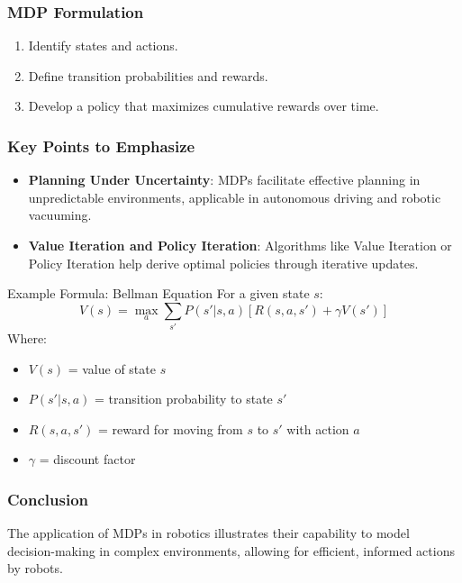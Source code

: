 \documentclass[aspectratio=169]{beamer}
\begin{document}
\begin{frame}[fragile]
    \frametitle{MDP Formulation}
    \begin{enumerate}
        \item Identify states and actions.
        \item Define transition probabilities and rewards.
        \item Develop a policy that maximizes cumulative rewards over time.
    \end{enumerate}
\end{frame}

\begin{frame}[fragile]
    \frametitle{Key Points to Emphasize}
    \begin{itemize}
        \item \textbf{Planning Under Uncertainty}: MDPs facilitate effective planning in unpredictable environments, applicable in autonomous driving and robotic vacuuming.
        \item \textbf{Value Iteration and Policy Iteration}: Algorithms like Value Iteration or Policy Iteration help derive optimal policies through iterative updates.
    \end{itemize}
    \begin{block}{Example Formula: Bellman Equation}
        For a given state \(s\):
        \begin{equation}
            V(s) = \max_{a} \sum_{s'} P(s'|s,a)[R(s, a, s') + \gamma V(s')]
        \end{equation}
        Where:
        \begin{itemize}
            \item \(V(s)\) = value of state \(s\)
            \item \(P(s'|s,a)\) = transition probability to state \(s'\)
            \item \(R(s, a, s')\) = reward for moving from \(s\) to \(s'\) with action \(a\)
            \item \(\gamma\) = discount factor
        \end{itemize}
    \end{block}
\end{frame}

\begin{frame}[fragile]
    \frametitle{Conclusion}
    The application of MDPs in robotics illustrates their capability to model decision-making in complex environments, allowing for efficient, informed actions by robots.
\end{frame}
\end{document}
